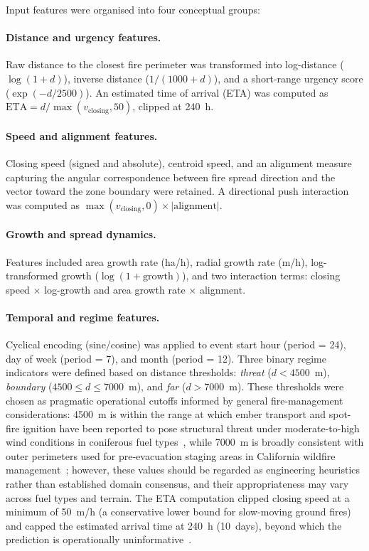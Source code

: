 \documentclass[fire,article,submit,pdftex]{../Definitions/mdpi}
\begin{document}
Input features were organised into four conceptual groups:

\paragraph{Distance and urgency features.}
Raw distance to the closest fire perimeter was transformed into log-distance ($\log(1 + d)$), inverse distance ($1 / (1000 + d)$), and a short-range urgency score ($\exp(-d / 2500)$).
An estimated time of arrival (ETA) was computed as $\text{ETA} = d / \max(v_{\mathrm{closing}}, 50)$, clipped at 240~h.

\paragraph{Speed and alignment features.}
Closing speed (signed and absolute), centroid speed, and an alignment measure capturing the angular correspondence between fire spread direction and the vector toward the zone boundary were retained.
A directional push interaction was computed as $\max(v_{\mathrm{closing}}, 0) \times |\text{alignment}|$.

\paragraph{Growth and spread dynamics.}
Features included area growth rate (ha/h), radial growth rate (m/h), log-transformed growth ($\log(1 + \text{growth})$), and two interaction terms: closing speed $\times$ log-growth and area growth rate $\times$ alignment.

\paragraph{Temporal and regime features.}
Cyclical encoding (sine/cosine) was applied to event start hour (period = 24), day of week (period = 7), and month (period = 12).
Three binary regime indicators were defined based on distance thresholds: \emph{threat} ($d < 4500$~m), \emph{boundary} ($4500 \leq d \leq 7000$~m), and \emph{far} ($d > 7000$~m).
These thresholds were chosen as pragmatic operational cutoffs informed by general fire-management considerations: 4500~m is within the range at which ember transport and spot-fire ignition have been reported to pose structural threat under moderate-to-high wind conditions in coniferous fuel types~\cite{Cruz2003,Finney2001}, while 7000~m is broadly consistent with outer perimeters used for pre-evacuation staging areas in California wildfire management~\cite{Dolan2022}; however, these values should be regarded as engineering heuristics rather than established domain consensus, and their appropriateness may vary across fuel types and terrain.
The ETA computation clipped closing speed at a minimum of 50~m/h (a conservative lower bound for slow-moving ground fires) and capped the estimated arrival time at 240~h (10~days), beyond which the prediction is operationally uninformative~\cite{Taylor2013}.
\end{document}
